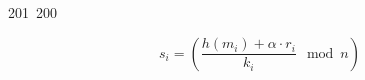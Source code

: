 201~200~\documentclass{article}
\begin{document}
	                                                                        	                                                                    	                                	                    	                    	                        	                        	                    	                                                                	                	                                                                    	                    							                                                                                                                                                                                                    \[
	                                                                        	                                                                    	                                	                    	                    	                        	                        	                    	                                                                	                	                                                                    	                    							                                                                                                                                                                                                    	s_i = \left( \frac{h(m_i) + \alpha \cdot r_i}{k_i} \mod n \right)
	                                                                        	                                                                    	                                	                    	                    	                        	                        	                    	                                                                	                	                                                                    	                    							                                                                                                                                                                                                    	\]
\end{document}
